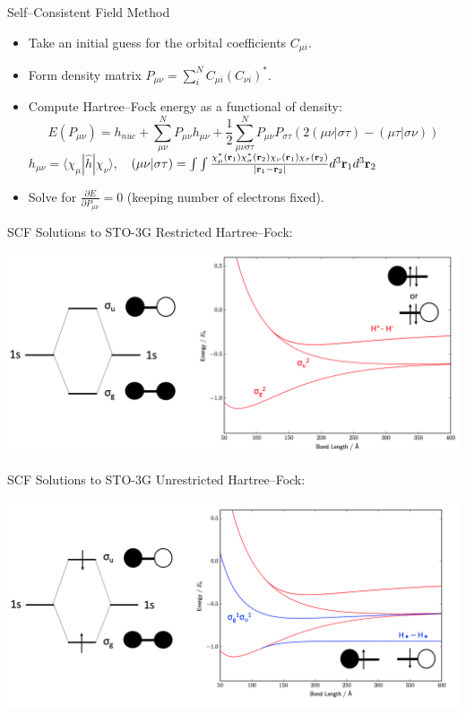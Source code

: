\documentclass{beamer}
\newcommand{\dbd}[2] {{\frac{\partial #1}{\partial #2}}}
\newcommand{\braket}[3] {{\langle #1 | #2 | #3 \rangle}}
\def\bfr{{\bf r}}
\begin{document}
\begin{frame}{Self--Consistent Field Method}
 \begin{itemize}
  \item<1-> Take an initial guess for the orbital coefficients $C_{\mu i}$.
  \item<2-> Form density matrix $P_{\mu\nu}=\sum_i^N C_{\mu i} (C_{\nu i})^{*}$.
  \item<3-> Compute Hartree--Fock energy as a functional of density:
  $$E(P_{\mu\nu}) = h_{nuc} + \sum_{\mu\nu}^N P_{\mu\nu} h_{\mu\nu} + \frac{1}{2} \sum_{\mu\nu\sigma\tau}^N P_{\mu\nu} P_{\sigma\tau} \left(2\left(\mu\nu|\sigma\tau\right) - \left(\mu\tau|\sigma\nu\right)\right)$$
  $h_{\mu\nu}=\braket{\chi_\mu}{\hat{h}}{\chi_\nu}$,\ \ $\left(\mu\nu|\sigma\tau\right)=\int\int\frac{\chi_\mu^*(\bfr_1)\chi^*_\sigma(\bfr_2)\chi_\nu(\bfr_1)\chi_\tau(\bfr_2)}{|\bfr_1-\bfr_2|}d^3\bfr_1d^3\bfr_2$
  \vspace{0.5em}
  \item<4-> Solve for $\dbd{E}{P_{\mu\nu}}=0$ (keeping number of electrons fixed).
 \end{itemize}
\end{frame}

\begin{frame}{SCF Solutions to  STO-3G}
Restricted Hartree--Fock:
  \begin{center}
    \includegraphics[scale=0.3]{H2_sto-3g_RHF}
  \end{center}
\end{frame}

\begin{frame}{SCF Solutions to  STO-3G}
Unrestricted Hartree--Fock:
  \begin{center}
    \includegraphics[scale=0.3]{H2_sto-3g_UHF}
  \end{center}
\end{frame}
\end{document}

